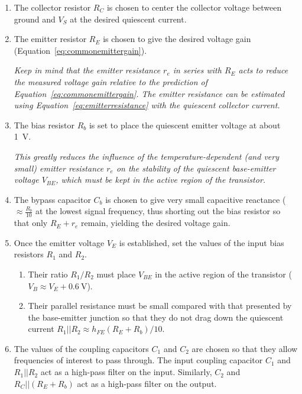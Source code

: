 \documentclass[11pt]{article}
\begin{document}
\begin{enumerate}
\item The collector resistor $R_C$ is chosen to center the collector
  voltage between ground and $V_S$ at the desired quiescent current.

\item The emitter resistor $R_E$ is chosen to give the desired voltage
  gain (Equation~\ref{eq:commonemittergain}).

  \emph{Keep in mind that the emitter resistance $r_e$ in series with
  $R_E$ acts to reduce the measured voltage gain relative to the
  prediction of Equation~\ref{eq:commonemittergain}. The emitter
  resistance can be estimated using
  Equation~\ref{eq:emitterresistance} with the quiescent collector
  current.}

\item The bias resistor $R_b$ is set to place the quiescent emitter
  voltage at about 1~V.

  \emph{This greatly reduces the influence of the
  temperature-dependent (and very small) emitter resistance $r_e$ on
  the stability of the quiescent base-emitter voltage $V_{BE}$, which
  must be kept in the active region of the transistor.}

\item The bypass capacitor $C_b$ is chosen to give very small
  capacitive reactance ($\approx \frac{R_b}{10}$ at the lowest signal
  frequency, thus shorting out the bias resistor so that only $R_E +
  r_e$ remain, yielding the desired voltage gain.

\item Once the emitter voltage $V_E$ is established, set the values of
  the input bias resistors $R_1$ and $R_2$.
  \begin{enumerate}
  \item Their ratio $R_1/R_2$ must place $V_{BE}$ in the active region
    of the transistor ($V_B \approx V_E + 0.6~\mathrm{V}$).

  \item Their parallel resistance must be small compared with that
    presented by the base-emitter junction so that they do not drag
    down the quiescent current $R_1 || R_2 \approx h_{FE} (R_E +
    R_b)/10$.
  \end{enumerate}

\item The values of the coupling capacitors $C_1$ and $C_2$ are chosen
  so that they allow frequencies of interest to pass through. The
  input coupling capacitor $C_1$ and $R_1||R_2$ act as a high-pass
  filter on the input. Similarly, $C_2$ and $R_C||(R_E + R_b)$ act as
  a high-pass filter on the output.
\end{enumerate}
\end{document}
